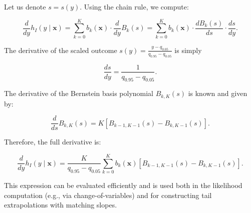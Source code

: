 Let us denote \( s = s(y) \). Using the chain rule, we compute:

\begin{equation}
\frac{d}{dy} h_I(y \mid \mathbf{x}) = \sum_{k=0}^{K} b_k(\mathbf{x}) \cdot \frac{d}{dy} B_k(s) = \sum_{k=0}^{K} b_k(\mathbf{x}) \cdot \frac{dB_k(s)}{ds} \cdot \frac{ds}{dy}.
\end{equation}

The derivative of the scaled outcome \( s(y) = \frac{y - q_{0.05}}{q_{0.95} - q_{0.05}} \) is simply

\begin{equation}
\frac{ds}{dy} = \frac{1}{q_{0.95} - q_{0.05}}.
\end{equation}

The derivative of the Bernstein basis polynomial \( B_{k,K}(s) \) is known and given by:

\begin{equation}
\frac{d}{ds} B_{k,K}(s) = K \left[ B_{k-1,K-1}(s) - B_{k,K-1}(s) \right].
\end{equation}

Therefore, the full derivative is:

\begin{equation}
\frac{d}{dy} h_I(y \mid \mathbf{x}) = \frac{K}{q_{0.95} - q_{0.05}} \sum_{k=0}^{K} b_k(\mathbf{x}) \left[ B_{k-1,K-1}(s) - B_{k,K-1}(s) \right].
\end{equation}

This expression can be evaluated efficiently and is used both in the likelihood computation (e.g., via change-of-variables) and for constructing tail extrapolations with matching slopes.

